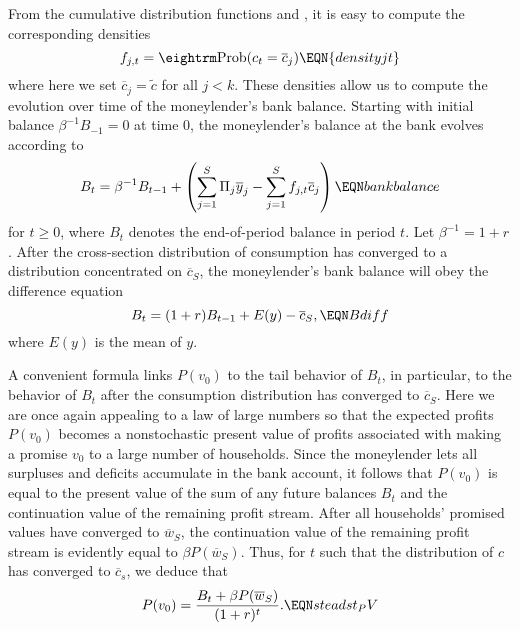   From the cumulative distribution functions  and
, it is easy to compute the corresponding densities
$$ f_{j,t} = {\rm Prob} (c_t = \overline c_j)   \EQN{densityjt} $$
where here we set $\overline c_j = \tilde c$ for all $j < k$.
These densities allow us to compute the evolution over time
of the moneylender's bank balance.  Starting with initial
balance $\beta^{-1} B_{-1} =0$ at time $0$, the moneylender's balance at
the bank evolves according to
$$ B_{t} = \beta^{-1} B_{t-1}
  + \left(\sum_{j=1}^S \Pi_j \overline y_j - \sum_{j=1}^S
  f_{j,t}  \overline c_j\right) \EQN bankbalance $$
for $t \geq 0$, where $B_t$ denotes the end-of-period balance
in period $t$.  Let $\beta^{-1} = 1+r$.
 After the cross-section distribution
of consumption has converged to a distribution
concentrated on $\overline c_S$, the moneylender's bank
balance will obey the difference equation
$$ B_t = (1+r) B_{t-1} + E(y) - \overline c_S , \EQN Bdiff  $$
where $E(y)$ is the mean of $y$.

A convenient formula links $P(v_0)$ to the tail behavior of $B_t$,
in particular, to the behavior of $B_t$  after the consumption
distribution has converged to $\overline c_S$. Here we are once
again appealing to a law of large numbers so that the expected
profits $P(v_0)$ becomes a nonstochastic present value of profits
associated with making a promise $v_0$ to a large number of
households. Since the moneylender lets all surpluses and deficits
 accumulate in the bank account, it follows that $P(v_0)$
is equal to the present value of the sum of any future balances
$B_t$ and the continuation value of the remaining profit stream.
After
all households' promised values have converged to $\overline
w_S$, the continuation value of the remaining profit stream is evidently
equal to $\beta P(\overline w_S)$.  Thus, for $t$ such that the distribution of $c$ has
converged to $\overline c_s$, we deduce that
$$
P(v_0) = {B_t + \beta P(\overline w_S) \over (1+r)^t }.   \EQN
steadst_PV
$$

